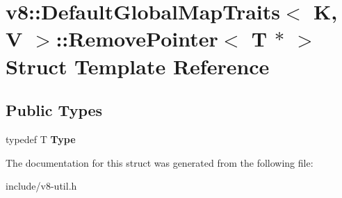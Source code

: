 \hypertarget{structv8_1_1_default_global_map_traits_1_1_remove_pointer_3_01_t_01_5_01_4}{}\section{v8\+:\+:Default\+Global\+Map\+Traits$<$ K, V $>$\+:\+:Remove\+Pointer$<$ T $\ast$ $>$ Struct Template Reference}
\label{structv8_1_1_default_global_map_traits_1_1_remove_pointer_3_01_t_01_5_01_4}
\subsection*{Public Types}
\begin{DoxyCompactItemize}
\item 
typedef T {\bfseries Type}\hypertarget{structv8_1_1_default_global_map_traits_1_1_remove_pointer_3_01_t_01_5_01_4_a8c940cb440e64fc01237ab0e1a976b9f}{}\label{structv8_1_1_default_global_map_traits_1_1_remove_pointer_3_01_t_01_5_01_4_a8c940cb440e64fc01237ab0e1a976b9f}

\end{DoxyCompactItemize}


The documentation for this struct was generated from the following file\+:\begin{DoxyCompactItemize}
\item 
include/v8-\/util.\+h\end{DoxyCompactItemize}
